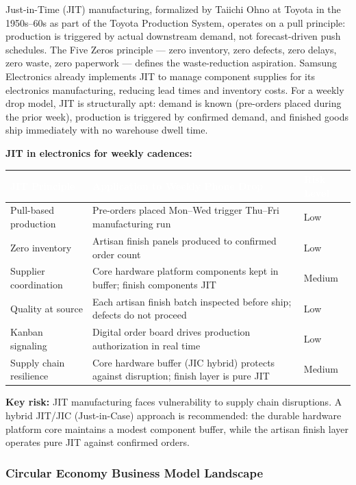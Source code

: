 \documentclass[11pt,letterpaper]{article}
\newcommand{\tableheader}[1]{\textbf{\sffamily\textcolor{white}{#1}}}
\begin{document}
Just-in-Time (JIT) manufacturing, formalized by Taiichi Ohno at Toyota in the 1950s--60s as part of the Toyota Production System, operates on a pull principle: production is triggered by actual downstream demand, not forecast-driven push schedules. The Five Zeros principle --- zero inventory, zero defects, zero delays, zero waste, zero paperwork --- defines the waste-reduction aspiration. Samsung Electronics already implements JIT to manage component supplies for its electronics manufacturing, reducing lead times and inventory costs. For a weekly drop model, JIT is structurally apt: demand is known (pre-orders placed during the prior week), production is triggered by confirmed demand, and finished goods ship immediately with no warehouse dwell time.

\textbf{JIT in electronics for weekly cadences:}
\begin{center}
\begin{tabularx}{\textwidth}{L{3cm}XC{2.5cm}}
\toprule
{}
\tableheader{JIT Principle} & \tableheader{Application to Weekly Phone Drop} & \tableheader{Risk Level} \\
\midrule
Pull-based production & Pre-orders placed Mon--Wed trigger Thu--Fri manufacturing run & Low \\
Zero inventory & Artisan finish panels produced to confirmed order count & Low \\
Supplier coordination & Core hardware platform components kept in buffer; finish components JIT & Medium \\
Quality at source & Each artisan finish batch inspected before ship; defects do not proceed & Low \\
Kanban signaling & Digital order board drives production authorization in real time & Low \\
Supply chain resilience & Core hardware buffer (JIC hybrid) protects against disruption; finish layer is pure JIT & Medium \\
\bottomrule
\end{tabularx}
\end{center}

\textbf{Key risk:} JIT manufacturing faces vulnerability to supply chain disruptions. A hybrid JIT/JIC (Just-in-Case) approach is recommended: the durable hardware platform core maintains a modest component buffer, while the artisan finish layer operates pure JIT against confirmed orders.

\subsubsection{Circular Economy Business Model Landscape}
\end{document}
